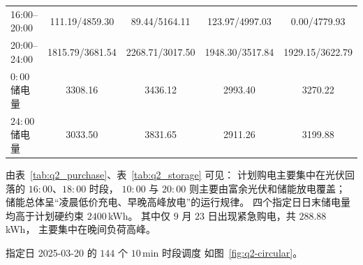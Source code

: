 \begin{samepage}
\begin{table}[H]
\begin{minipage}[t]{0.485\textwidth}
{\begin{tabular}{lcccc}
      16:00--20:00
        & 111.19/4859.30
        & 89.44/5164.11
        & 123.97/4997.03
        & 0.00/4779.93 \\[7.9pt]

      \rowcolor{rowblue}
      20:00--24:00
        & 1815.79/3681.54
        & 2268.71/3017.50
        & 1948.30/3517.84
        & 1929.15/3622.79 \\[7.9pt]

      \midrule

      $0{:}00$ 储电量
        & 3308.16
        & 3436.12
        & 2993.40
        & 3270.22 \\[7.9pt]

      \rowcolor{rowblue}
      $24{:}00$ 储电量
        & 3033.50
        & 3831.65
        & 2911.26
        & 3199.88 \\

      \bottomrule
    \end{tabular}%
  }

\end{minipage}

\end{table}

\vspace{-0.4em}

\noindent

由表~\ref{tab:q2_purchase}、表~\ref{tab:q2_storage} 可见：
计划购电主要集中在光伏回落的 $16{:}00$、$18{:}00$ 时段，
$10{:}00$ 与 $20{:}00$ 则主要由富余光伏和储能放电覆盖；
储能总体呈“凌晨低价充电、早晚高峰放电”的运行规律。
四个指定日日末储电量均高于计划硬约束 $2400$\,kWh。
其中仅 $9$ 月 $23$ 日出现紧急购电，共 $288.88$\,kWh，
主要集中在晚间负荷高峰。

\end{samepage}



指定日 2025-03-20 的 $144$ 个 $10\,\mathrm{min}$ 时段调度
如图~\ref{fig:q2-circular}。

